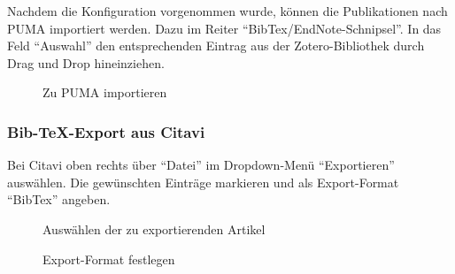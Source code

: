 Nachdem die Konfiguration vorgenommen wurde, können die Publikationen nach PUMA importiert werden. 
Dazu im Reiter \enquote{BibTex/EndNote-Schnipsel}. In das Feld \enquote{Auswahl} den entsprechenden Eintrag aus der Zotero-Bibliothek durch Drag und Drop hineinziehen.
\begin{figure}[h!]
 \centering
 \caption{Zu PUMA importieren}
 \label{fig:zuPumaImportieren}
\end{figure}

\subsubsection*{Bib-TeX-Export aus Citavi}\label{sss:importCitavi} 
Bei Citavi oben rechts über \enquote{Datei} im Dropdown-Menü \enquote{Exportieren} auswählen. Die gewünschten Einträge markieren und als Export-Format \enquote{BibTex} angeben.
    
\begin{figure}[h!]
 \centering
 \caption{Auswählen der zu exportierenden Artikel}
 \label{fig:exportierendenArtikelAuswaehlen}
\end{figure}

  
\begin{figure}[h!]
 \centering
 \caption{Export-Format festlegen}
 \label{fig:exportFormatFestlegen}
\end{figure}

